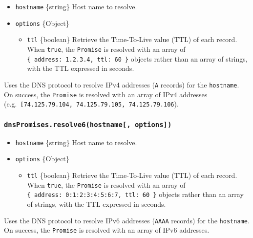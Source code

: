 \begin{itemize}
\tightlist
\item
  \texttt{hostname} \{string\} Host name to resolve.
\item
  \texttt{options} \{Object\}

  \begin{itemize}
  \tightlist
  \item
    \texttt{ttl} \{boolean\} Retrieve the Time-To-Live value (TTL) of
    each record. When \texttt{true}, the \texttt{Promise} is resolved
    with an array of
    \texttt{\{\ address:\ \textquotesingle{}1.2.3.4\textquotesingle{},\ ttl:\ 60\ \}}
    objects rather than an array of strings, with the TTL expressed in
    seconds.
  \end{itemize}
\end{itemize}

Uses the DNS protocol to resolve IPv4 addresses (\texttt{A} records) for
the \texttt{hostname}. On success, the \texttt{Promise} is resolved with
an array of IPv4 addresses
(e.g.~\texttt{{[}\textquotesingle{}74.125.79.104\textquotesingle{},\ \textquotesingle{}74.125.79.105\textquotesingle{},\ \textquotesingle{}74.125.79.106\textquotesingle{}{]}}).

\subsubsection{\texorpdfstring{\texttt{dnsPromises.resolve6(hostname{[},\ options{]})}}{dnsPromises.resolve6(hostname{[}, options{]})}}\label{dnspromises.resolve6hostname-options}

\begin{itemize}
\tightlist
\item
  \texttt{hostname} \{string\} Host name to resolve.
\item
  \texttt{options} \{Object\}

  \begin{itemize}
  \tightlist
  \item
    \texttt{ttl} \{boolean\} Retrieve the Time-To-Live value (TTL) of
    each record. When \texttt{true}, the \texttt{Promise} is resolved
    with an array of
    \texttt{\{\ address:\ \textquotesingle{}0:1:2:3:4:5:6:7\textquotesingle{},\ ttl:\ 60\ \}}
    objects rather than an array of strings, with the TTL expressed in
    seconds.
  \end{itemize}
\end{itemize}

Uses the DNS protocol to resolve IPv6 addresses (\texttt{AAAA} records)
for the \texttt{hostname}. On success, the \texttt{Promise} is resolved
with an array of IPv6 addresses.

